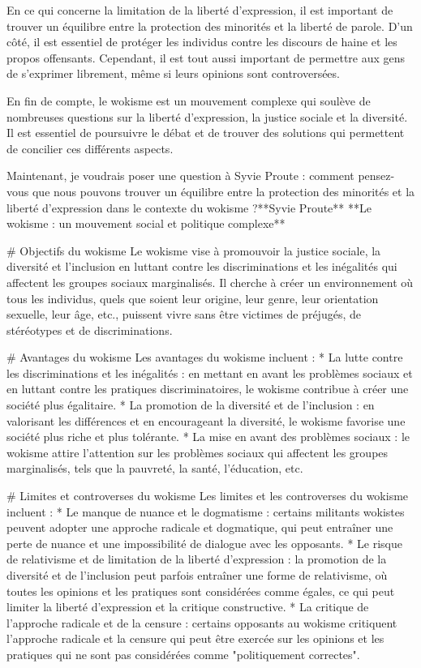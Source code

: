 En ce qui concerne la limitation de la liberté d'expression, il est important de trouver un équilibre entre la protection des minorités et la liberté de parole. D'un côté, il est essentiel de protéger les individus contre les discours de haine et les propos offensants. Cependant, il est tout aussi important de permettre aux gens de s'exprimer librement, même si leurs opinions sont controversées.

En fin de compte, le wokisme est un mouvement complexe qui soulève de nombreuses questions sur la liberté d'expression, la justice sociale et la diversité. Il est essentiel de poursuivre le débat et de trouver des solutions qui permettent de concilier ces différents aspects.

Maintenant, je voudrais poser une question à Syvie Proute : comment pensez-vous que nous pouvons trouver un équilibre entre la protection des minorités et la liberté d'expression dans le contexte du wokisme ?**Syvie Proute**
**Le wokisme : un mouvement social et politique complexe**

# Objectifs du wokisme
Le wokisme vise à promouvoir la justice sociale, la diversité et l'inclusion en luttant contre les discriminations et les inégalités qui affectent les groupes sociaux marginalisés. Il cherche à créer un environnement où tous les individus, quels que soient leur origine, leur genre, leur orientation sexuelle, leur âge, etc., puissent vivre sans être victimes de préjugés, de stéréotypes et de discriminations.

# Avantages du wokisme
Les avantages du wokisme incluent :
* La lutte contre les discriminations et les inégalités : en mettant en avant les problèmes sociaux et en luttant contre les pratiques discriminatoires, le wokisme contribue à créer une société plus égalitaire.
* La promotion de la diversité et de l'inclusion : en valorisant les différences et en encourageant la diversité, le wokisme favorise une société plus riche et plus tolérante.
* La mise en avant des problèmes sociaux : le wokisme attire l'attention sur les problèmes sociaux qui affectent les groupes marginalisés, tels que la pauvreté, la santé, l'éducation, etc.

# Limites et controverses du wokisme
Les limites et les controverses du wokisme incluent :
* Le manque de nuance et le dogmatisme : certains militants wokistes peuvent adopter une approche radicale et dogmatique, qui peut entraîner une perte de nuance et une impossibilité de dialogue avec les opposants.
* Le risque de relativisme et de limitation de la liberté d'expression : la promotion de la diversité et de l'inclusion peut parfois entraîner une forme de relativisme, où toutes les opinions et les pratiques sont considérées comme égales, ce qui peut limiter la liberté d'expression et la critique constructive.
* La critique de l'approche radicale et de la censure : certains opposants au wokisme critiquent l'approche radicale et la censure qui peut être exercée sur les opinions et les pratiques qui ne sont pas considérées comme "politiquement correctes".

